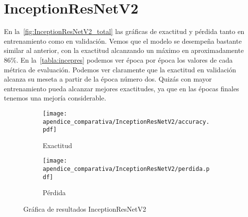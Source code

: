 \section{InceptionResNetV2}
En la~\autoref{fig:InceptionResNetV2_total} las gráficas de exactitud y pérdida
tanto en entrenamiento como en validación. Vemos que el modelo se desempeña
bastante similar al anterior, con la exactitud alcanzando un máximo en
aproximadamente 86\%. En la~\autoref{tabla:incepres} podemos ver época por época
los valores de cada métrica de evaluación. Podemos ver claramente que la
exactitud en validación alcanza su meseta a partir de la época número dos.
Quizás con mayor entrenamiento pueda alcanzar mejores exactitudes, ya que en las
épocas finales tenemos una mejoría considerable.
\begin{figure}[H]
    \centering
    \begin{subfigure}[b]{0.8\textwidth}
        \centering
       \texttt{[image: apendice\_comparativa/InceptionResNetV2/accuracy.pdf]}
       \caption{Exactitud}\label{fig:accuracy_incepres} 
    \end{subfigure}
    \begin{subfigure}[b]{0.8\textwidth}
        \centering
       \texttt{[image: apendice\_comparativa/InceptionResNetV2/perdida.pdf]}
       \caption{Pérdida}\label{fig:perdida_incepres}
    \end{subfigure}
    \caption{Gráfica de resultados InceptionResNetV2}\label{fig:InceptionResNetV2_total}
\end{figure}
